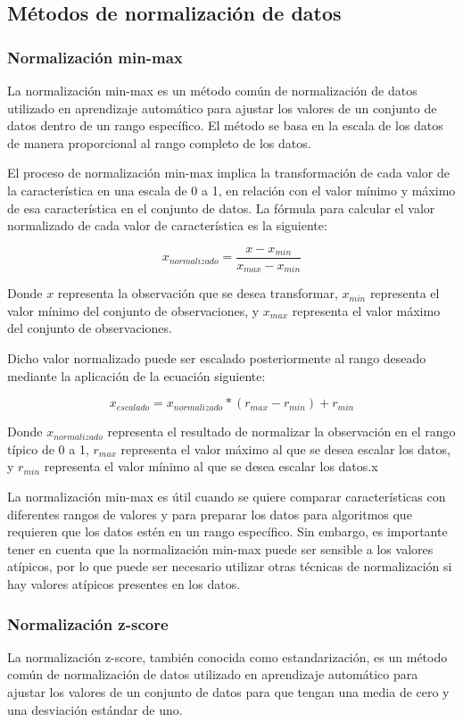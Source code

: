 \subsection{Métodos de normalización de datos}

\subsubsection{Normalización min-max}
La normalización min-max es un método común de normalización de datos utilizado en aprendizaje automático para ajustar los valores de un conjunto de datos dentro de un rango específico. El método se basa en la escala de los datos de manera proporcional al rango completo de los datos.

El proceso de normalización min-max implica la transformación de cada valor de la característica en una escala de 0 a 1, en relación con el valor mínimo y máximo de esa característica en el conjunto de datos. La fórmula para calcular el valor normalizado de cada valor de característica es la siguiente:

$$x_{normalizado} = \frac{x - x_{min}}{x_{max} - x_{min}}$$

Donde $x$ representa la observación que se desea transformar, $x_{min}$ representa el valor mínimo del conjunto de observaciones, y $x_{max}$ representa el valor máximo del conjunto de observaciones.

Dicho valor normalizado puede ser escalado posteriormente al rango deseado mediante la aplicación de la ecuación siguiente:

$$x_{escalado} = x_{normalizado} * (r_{max} - r_{min}) + r_{min}$$

Donde $x_{normalizado}$ representa el resultado de normalizar la observación en el rango típico de 0 a 1, $r_{max}$ representa el valor máximo al que se desea escalar los datos, y $r_{min}$ representa el valor mínimo al que se desea escalar los datos.x

La normalización min-max es útil cuando se quiere comparar características con diferentes rangos de valores y para preparar los datos para algoritmos que requieren que los datos estén en un rango específico. Sin embargo, es importante tener en cuenta que la normalización min-max puede ser sensible a los valores atípicos, por lo que puede ser necesario utilizar otras técnicas de normalización si hay valores atípicos presentes en los datos.

\subsubsection{Normalización z-score}
La normalización z-score, también conocida como estandarización, es un método común de normalización de datos utilizado en aprendizaje automático para ajustar los valores de un conjunto de datos para que tengan una media de cero y una desviación estándar de uno.

